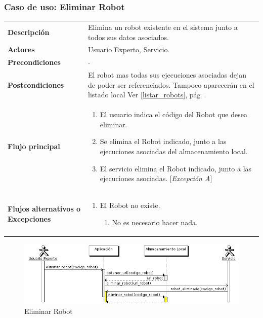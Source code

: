 \subsubsection{\large{Caso de uso: Eliminar Robot}}

\begin{tabular}[h]{ p{ } p{ }}

\textbf{Descripción} & Elimina un robot existente en el sistema junto
a todos sus datos asociados.\\[3mm]

\textbf{Actores} & Usuario Experto, Servicio.\\[3mm]

\textbf{Precondiciones} & - \\[3mm]

\textbf{Postcondiciones} & El robot mas todas sus ejecuciones
asociadas dejan de poder ser referenciados. Tampoco aparecerán en el
listado local Ver \ref{listar_robots},
pág~\pageref{listar_robots}.\\[3mm]

\textbf{Flujo principal} & \begin{enumerate}[leftmargin=1em,topsep=0pt, partopsep=0pt]
  \item El usuario indica el código del Robot que desea eliminar.
  \item Se elimina el Robot indicado, junto a las ejecuciones
    asociadas del almacenamiento local.
  \item El servicio elimina el Robot indicado, junto a las ejecuciones
    asociadas. [\emph{Excepción A}]
\end{enumerate}\\[3mm]

\textbf{Flujos alternativos o Excepciones} &
\begin{enumerate}[label=\Alph*:,leftmargin=1em,topsep=0pt, partopsep=0pt]
\item El Robot no existe.
  \begin{enumerate}[label=\arabic*.,topsep=0pt, partopsep=0pt]
    \item No es necesario hacer nada.
  \end{enumerate}
\end{enumerate}\\[3mm]
\end{tabular}

\begin{figure}[bp!]
  \includegraphics[width=1\textwidth]{chapters/technical-manual/diagrams/sequence/expert_user/eliminar_robot.png}
\caption{Eliminar Robot}
\end{figure}
\clearpage
